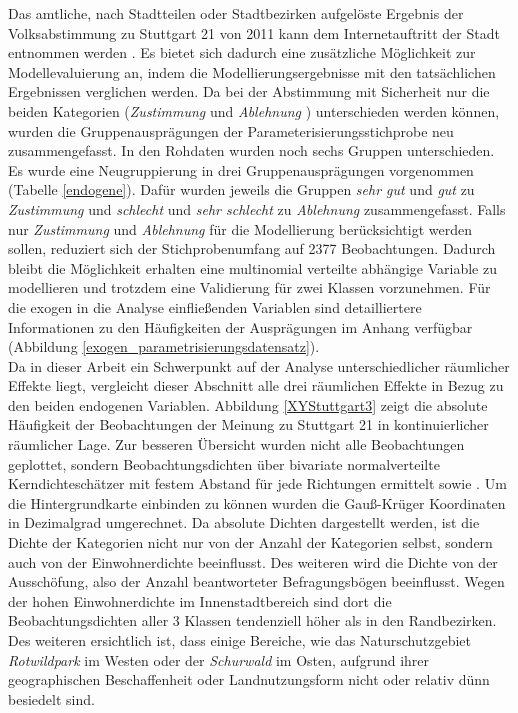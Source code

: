 \documentclass{Vorlage}
\begin{document}
Das amtliche, nach Stadtteilen oder Stadtbezirken aufgelöste Ergebnis der Volksabstimmung zu Stuttgart 21 von 2011 kann 
dem Internetauftritt der Stadt entnommen werden \cite{Amt}. Es bietet sich dadurch eine zusätzliche Möglichkeit zur 
Modellevaluierung an, indem die Modellierungsergebnisse mit den tatsächlichen Ergebnissen verglichen werden. Da bei der 
Abstimmung mit Sicherheit nur die beiden Kategorien (\textit{Zustimmung} und \textit{Ablehnung }) unterschieden werden 
können, wurden die Gruppenausprägungen der Parameterisierungsstichprobe neu zusammengefasst. In den Rohdaten wurden noch 
sechs Gruppen unterschieden. Es wurde eine Neugruppierung in drei Gruppenausprägungen vorgenommen (Tabelle \ref{endogene}). Dafür wurden jeweils die 
Gruppen \textit{sehr gut} und \textit{gut} zu \textit{Zustimmung} und \textit{schlecht} und \textit{sehr schlecht} zu 
\textit{Ablehnung} zusammengefasst. Falls nur \textit{Zustimmung} und \textit{Ablehnung} für die Modellierung 
berücksichtigt werden sollen, reduziert sich der Stichprobenumfang auf 2377 Beobachtungen. Dadurch bleibt die 
Möglichkeit erhalten eine multinomial verteilte abhängige Variable zu modellieren und trotzdem eine Validierung für 
zwei Klassen vorzunehmen. Für die exogen in die Analyse einfließenden Variablen sind detailliertere Informationen zu den 
Häufigkeiten der Ausprägungen im Anhang verfügbar (Abbildung \ref{exogen_parametrisierungsdatensatz}). \\

Da in dieser Arbeit ein Schwerpunkt auf der Analyse unterschiedlicher räumlicher Effekte liegt, vergleicht dieser Abschnitt alle drei räumlichen Effekte in Bezug zu den beiden endogenen Variablen. Abbildung \ref{XYStuttgart3} zeigt die absolute Häufigkeit der Beobachtungen der Meinung zu Stuttgart 21 in kontinuierlicher räumlicher Lage. Zur besseren Übersicht wurden nicht alle Beobachtungen geplottet, sondern Beobachtungsdichten über bivariate normalverteilte Kerndichteschätzer mit festem Abstand für jede Richtungen ermittelt \cite{ggplot} sowie \cite{MASS}. Um die Hintergrundkarte einbinden zu können wurden die Gauß-Krüger Koordinaten in Dezimalgrad umgerechnet. Da absolute Dichten dargestellt werden, ist die Dichte der Kategorien nicht nur von der Anzahl der Kategorien selbst, sondern auch von der Einwohnerdichte beeinflusst. Des weiteren wird die Dichte von der Ausschöfung, also der Anzahl beantworteter Befragungsbögen beeinflusst. Wegen der hohen Einwohnerdichte im Innenstadtbereich sind dort die Beobachtungsdichten aller 3 Klassen tendenziell höher als in den Randbezirken. Des weiteren ersichtlich ist, dass einige Bereiche, wie das Naturschutzgebiet \textit{Rotwildpark} im Westen oder der \textit{Schurwald} im Osten, aufgrund ihrer geographischen Beschaffenheit oder Landnutzungsform nicht oder relativ dünn besiedelt sind.
\end{document}
